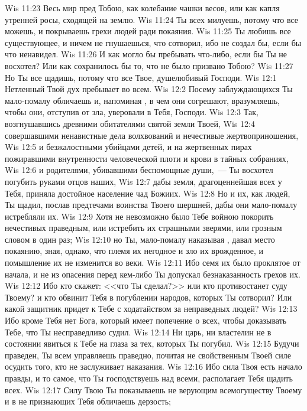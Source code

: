 \vs Wis 11:23 Весь мир пред Тобою, как колебание чашки весов, или как капля утренней росы, сходящей на землю.
\vs Wis 11:24 Ты всех милуешь, потому что все можешь, и покрываешь грехи людей ради покаяния.
\vs Wis 11:25 Ты любишь все существующее, и ничем не гнушаешься, что сотворил, ибо не создал бы, если бы что ненавидел.
\vs Wis 11:26 И как могло бы пребывать что-либо, если бы Ты не восхотел? Или как сохранилось бы то, что не было призвано Тобою?
\vs Wis 11:27 Но Ты все щадишь, потому что все Твое, душелюбивый Господи.
\vs Wis 12:1 Нетленный Твой дух пребывает во всем.
\vs Wis 12:2 Посему заблуждающихся Ты мало-помалу обличаешь и, напоминая , в чем они согрешают, вразумляешь, чтобы они, отступив от зла, уверовали в Тебя, Господи.
\vs Wis 12:3 Так, возгнушавшись древними обитателями святой земли Твоей,
\vs Wis 12:4 совершавшими ненавистные дела волхвований и нечестивые жертвоприношения,
\vs Wis 12:5 и безжалостными убийцами детей, и на жертвенных пирах пожиравшими внутренности человеческой плоти и крови в тайных собраниях,
\vs Wis 12:6 и родителями, убивавшими беспомощные души,~--- Ты восхотел погубить  руками отцов наших,
\vs Wis 12:7 дабы земля, драгоценнейшая всех у Тебя, приняла достойное население чад Божиих.
\vs Wis 12:8 Но и их, как людей, Ты щадил, послав предтечами воинства Твоего шершней, дабы они мало-помалу истребляли их.
\vs Wis 12:9 Хотя не невозможно было Тебе войною покорить нечестивых праведным, или истребить их страшными зверями, или грозным словом в один раз;
\vs Wis 12:10 но Ты, мало-помалу наказывая , давал место покаянию, зная, однако, что племя их негодное и зло их врожденное, и помышление их не изменится во веки.
\vs Wis 12:11 Ибо семя их было проклятое от начала, и не из опасения перед кем-либо Ты допускал безнаказанность грехов их.
\vs Wis 12:12 Ибо кто скажет: <<что Ты сделал?>> или кто противостанет суду Твоему? и кто обвинит Тебя в погублении народов, которых Ты сотворил? Или какой защитник придет к Тебе с ходатайством за неправедных людей?
\vs Wis 12:13 Ибо кроме Тебя нет Бога, который имеет попечение о всех, чтобы доказывать Тебе, что Ты несправедливо судил.
\vs Wis 12:14 Ни царь, ни властелин не в состоянии явиться к Тебе на глаза за тех, которых Ты погубил.
\vs Wis 12:15 Будучи праведен, Ты всем управляешь праведно, почитая не свойственным Твоей силе осудить того, кто не заслуживает наказания.
\vs Wis 12:16 Ибо сила Твоя есть начало правды, и то самое, что Ты господствуешь над всеми, располагает Тебя щадить всех.
\vs Wis 12:17 Силу Твою Ты показываешь не верующим всемогуществу Твоему и в не признающих Тебя обличаешь дерзость;

